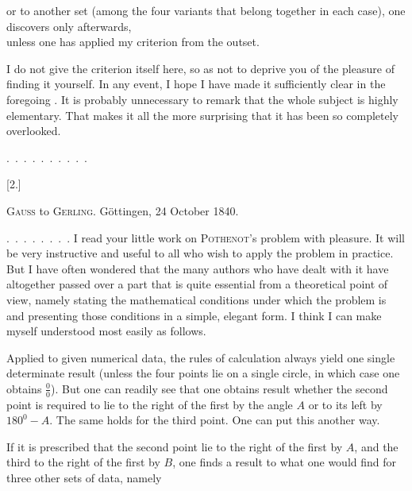 %
or to another set (among the four variants that belong together in each case), one discovers only afterwards,\\\hspace*{2em}unless one has applied my criterion from the outset.

I do not give the criterion itself here, so as not to deprive you of the pleasure of finding it yourself. In any event, I hope I have made it sufficiently clear in the foregoing . It is probably unnecessary to remark that the whole subject is highly elementary. That makes it all the more surprising that it has been so completely overlooked.

\mbox{. . . . . . . . . .}

\begin{center}[2.]\end{center}

\begin{center}\textsc{Gauss} to \textsc{Gerling}. Göttingen, 24 October 1840.\end{center}

\indent \mbox{. . . . . . . .} I read your little work on \textsc{Pothenot}'s problem with pleasure. It will be very instructive and useful to all who wish to apply the problem in practice. But I have often wondered that the many authors who have dealt with it have altogether passed over a part that is quite essential from a theoretical point of view, namely stating the mathematical conditions under which the problem is  and presenting those conditions in a simple, elegant form. I think I can make myself understood most easily as follows.

Applied to given numerical data, the rules of calculation always yield one single determinate result (unless the four points lie on a single circle, in which case one obtains $\frac{0}{0}$). But one can readily see that one obtains  result whether the second point is required to lie to the right of the first by the angle $A$ or to its left by $180^0-A$. The same holds for the third point. One can put this another way.

If it is prescribed that the second point lie to the right of the first by $A$, and the third to the right of the first by $B$, one finds a result  to what one would find for three other sets of data, namely
